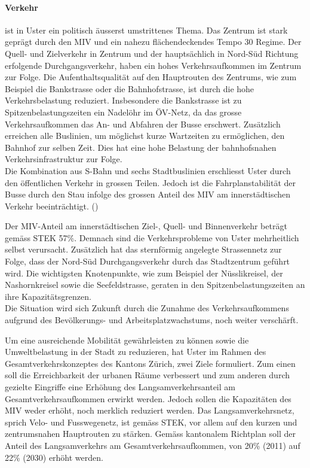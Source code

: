 \paragraph{Verkehr} ist in Uster ein politisch äusserst umstrittenes Thema. Das Zentrum ist stark geprägt durch den MIV und ein nahezu flächendeckendes Tempo 30 Regime. Der Quell- und Zielverkehr in Zentrum und der hauptsächlich in Nord-Süd Richtung erfolgende Durchgangsverkehr, haben ein hohes Verkehrsaufkommen im Zentrum zur Folge. Die Aufenthaltsqualität auf den Hauptrouten des Zentrums, wie zum Beispiel die Bankstrasse oder die Bahnhofstrasse, ist durch die hohe Verkehrsbelastung reduziert. Insbesondere die Bankstrasse ist zu Spitzenbelastungszeiten ein Nadelöhr im ÖV-Netz, da das grosse Verkehrsaufkommen das An- und Abfahren der Busse erschwert. Zusätzlich erreichen alle Buslinien, um möglichst kurze Wartzeiten zu ermöglichen, den Bahnhof zur selben Zeit. Dies hat eine hohe Belastung der bahnhofsnahen Verkehrsinfrastruktur zur Folge. \\
Die Kombination aus S-Bahn und sechs Stadtbuslinien erschliesst Uster durch den öffentlichen Verkehr in grossen Teilen. Jedoch ist die Fahrplanstabilität der Busse durch den Stau infolge des grossen Anteil des MIV am innerstädtischen Verkehr beeinträchtigt. (\cite{STEK})

Der MIV-Anteil am innerstädtischen Ziel-, Quell- und Binnenverkehr beträgt gemäss STEK 57\%. Demnach sind die Verkehrsprobleme von Uster mehrheitlich selbst verursacht. Zusätzlich hat das sternförmig angelegte Strassennetz zur Folge, dass der Nord-Süd Durchgangsverkehr durch das Stadtzentrum geführt wird. Die wichtigsten Knotenpunkte, wie zum Beispiel der Nüsslikreisel, der Nashornkreisel sowie die Seefeldstrasse, geraten in den Spitzenbelastungszeiten an ihre Kapazitätsgrenzen. \\
Die Situation wird sich Zukunft durch die Zunahme des Verkehrsaufkommens aufgrund des Bevölkerungs- und Arbeitsplatzwachstums, noch weiter verschärft. 

Um eine ausreichende Mobilität gewährleisten zu können sowie die Umweltbelastung in der Stadt zu reduzieren, hat Uster im Rahmen des Gesamtverkehrskonzeptes des Kantons Zürich, zwei Ziele formuliert. Zum einen soll die Erreichbarkeit der urbanen Räume verbessert und zum anderen durch gezielte Eingriffe eine Erhöhung des Langsamverkehrsanteil am Gesamtverkehrsaufkommen erwirkt werden. Jedoch sollen die Kapazitäten des MIV weder erhöht, noch merklich reduziert werden. Das Langsamverkehrsnetz, sprich Velo- und Fusswegenetz, ist gemäss STEK, vor allem auf den kurzen und zentrumsnahen Hauptrouten zu stärken. Gemäss kantonalem Richtplan soll der Anteil des Langsamverkehrs am Gesamtverkehrsaufkommen, von 20\% (2011) auf 22\% (2030) erhöht werden. 

